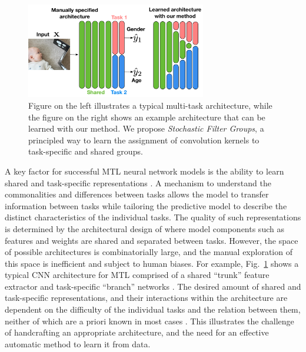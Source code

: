 \begin{figure}[t]
\centering 
\includegraphics[width=0.7\textwidth]{chapter_6/figures/intro_2.pdf}
\caption{\small Figure on the left illustrates a typical multi-task architecture, while the figure on the right shows an example architecture that can be learned with our method. We propose \emph{Stochastic Filter Groups}, a principled way to learn the assignment of convolution kernels to task-specific and shared groups. }
\label{fig:intro}
\vspace{-4mm}
\end{figure}

A key factor for successful MTL neural network models is the ability to learn shared and task-specific representations \cite{MisraCrossMTL16}. A mechanism to understand the commonalities and differences between tasks allows the model to transfer information between tasks while tailoring the predictive model to describe the distinct characteristics of the individual tasks. The quality of such representations is determined by the architectural design of where model components such as features \cite{Ruder2019SluiceNL} and weights \cite{meyerson2018beyond} are shared and separated between tasks. However, the space of possible architectures is combinatorially large, and the manual exploration of this space is inefficient and subject to human biases. For example, Fig.~\ref{fig:intro} shows a typical CNN architecture for MTL comprised of a shared ``trunk'' feature extractor and task-specific ``branch'' networks \cite{tanno2018autodvt,huang2015cross,jou2016deep,kendall2017multi,ranjan2019hyperface, bragman2018multi}. The desired amount of shared and task-specific representations, and their interactions within the architecture are dependent on the difficulty of the individual tasks and the relation between them, neither of which are a priori known in most cases \cite{taskonomy2018}. This illustrates the challenge of handcrafting an appropriate architecture, and the need for an effective automatic method to learn it from data. 

